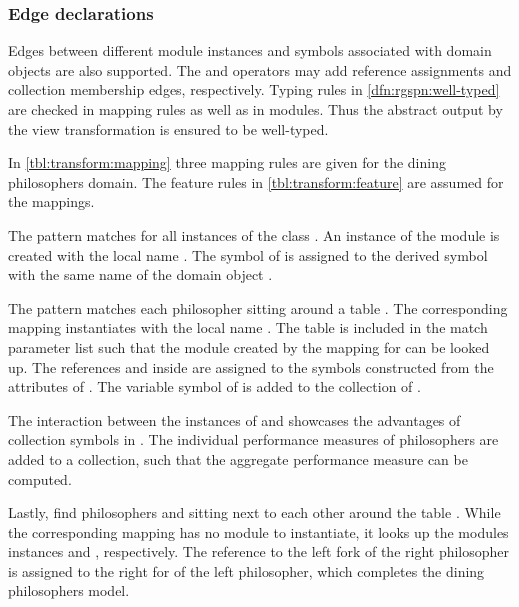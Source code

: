 \subsubsection{Edge declarations}

Edges between different  module instances and symbols associated with domain objects are also supported. The \lit{:=} and \lit{+=} operators may add reference assignments and collection membership edges, respectively. Typing rules in \vref{dfn:rgspn:well-typed} are checked in mapping rules as well as in  modules. Thus the abstract  output by the view transformation is ensured to be well-typed.

\begin{runningExample}
  In \vref{tbl:transform:mapping} three mapping rules are given for the dining philosophers domain. The feature rules in \vref{tbl:transform:feature} are assumed for the mappings.

  The pattern  matches for all instances  of the class . An instance of the module  is created with the local name . The symbol  of  is assigned to the derived symbol with the same name of the domain object .

  The pattern  matches each philosopher  sitting around a table . The corresponding mapping instantiates  with the local name . The table  is included in the match parameter list such that the module  created by the mapping  for  can be looked up. The references  and  inside  are assigned to the symbols constructed from the attributes of . The variable symbol  of  is added to the collection  of .

  The interaction between the instances of  and  showcases the advantages of collection symbols in . The individual performance measures  of philosophers are added to a collection, such that the aggregate performance measure  can be computed.

  Lastly,  find philosophers  and  sitting next to each other around the table . While the corresponding mapping has no  module to instantiate, it looks up the modules instances  and , respectively. The reference to the left fork of the right philosopher is assigned to the right for of the left philosopher, which completes the dining philosophers model.
\end{runningExample}

